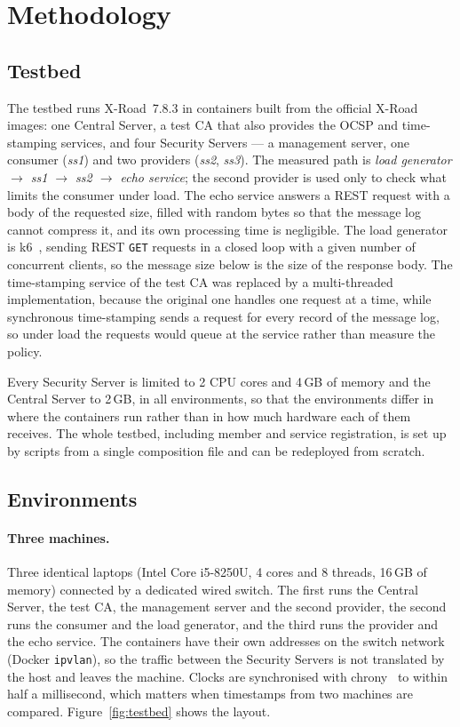 \documentclass[conference,a4paper]{IEEEtran}
\newcommand{\newtext}[1]{{\color{blue}#1}}
\begin{document}
\section{Methodology}

\subsection{Testbed}\label{sec:testbed}

The testbed runs X-Road~7.8.3 in containers built from the official X-Road images: one Central Server, a
test CA that also provides the OCSP and time-stamping services, and four Security Servers --- a
management server, one consumer (\emph{ss1}) and two providers (\emph{ss2}, \emph{ss3}). The measured
path is \emph{load generator $\rightarrow$ ss1 $\rightarrow$ ss2 $\rightarrow$ echo service}; the second
provider is used only to check what limits the consumer under load. The echo service answers a REST
request with a body of the requested size, filled with random bytes so that the message log cannot
compress it, and its own processing time is negligible. The load generator is k6\newtext{~\cite{k6}}, sending REST
\texttt{GET} requests in a closed loop with a given number of concurrent clients, so the message size
below is the size of the response body. The time-stamping service of the test CA was replaced by a
multi-threaded implementation, because the original one handles one request at a time\newtext{, while
synchronous time-stamping sends a request for every record of the message log, so under load the
requests would queue at the service rather than measure the policy}.

Every Security Server is limited to 2 CPU cores and 4\,GB of memory and the Central Server to 2\,GB,
in all environments, so that the environments differ in where the containers run rather than in how
much hardware each of them receives. The whole testbed, including member and service registration,
is set up by scripts from a single composition file and can be redeployed from scratch.

\subsection{Environments}\label{sec:env}

\paragraph{Three machines.} Three identical laptops (Intel Core i5-8250U, 4 cores and 8 threads,
16\,GB of memory) connected by a dedicated wired switch. The first runs the Central Server, the test
CA, the management server and the second provider, the second runs the consumer and the load
generator, and the third runs the provider and the echo service. The containers have their own
addresses on the switch network (Docker \texttt{ipvlan}), so the traffic between the Security
Servers is not translated by the host and leaves the machine. Clocks are synchronised with chrony\newtext{~\cite{chrony}} to
within half a millisecond, which matters when timestamps from two machines are compared.
Figure~\ref{fig:testbed} shows the layout.
\end{document}
